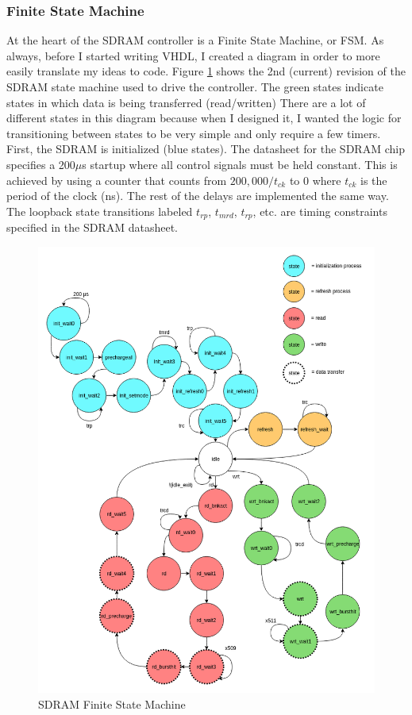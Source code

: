\documentclass{article}
\begin{document}
\subsubsection{Finite State Machine}
At the heart of the SDRAM controller is a Finite State Machine, or FSM. As always, before I started writing VHDL, I created a diagram in order to more easily translate my ideas to code. Figure \ref{fig:sdramfsm} shows the 2nd (current) revision of the SDRAM state machine used to drive the controller. The green states indicate states in which data is being transferred (read/written) There are a lot of different states in this diagram because when I designed it, I wanted the logic for transitioning between states to be very simple and only require a few timers. First, the SDRAM is initialized (blue states). The datasheet for the SDRAM chip specifies a 200$\mu$s startup where all control signals must be held constant. This is achieved by using a counter that counts from $200,000 / t_{ck}$ to 0 where $t_{ck}$ is the period of the clock (ns). The rest of the delays are implemented the same way. The loopback state transitions labeled $t_{rp}$, $t_{mrd}$, $t_{rp}$, etc. are timing constraints specified in the SDRAM datasheet.

\begin{figure}[!htb]
\caption{SDRAM Finite State Machine}
\label{fig:sdramfsm}
\centering
\includegraphics[scale=0.23]{sdramfsm2.png}
\end{figure}
\end{document}

